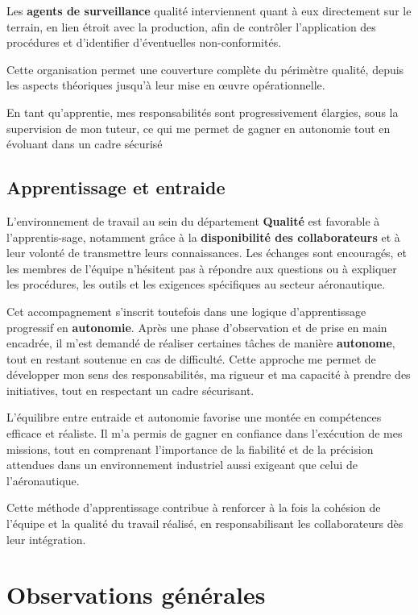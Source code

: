 \noindent Les \textbf{agents de surveillance} qualité interviennent quant à eux directement sur le terrain, en lien étroit avec la production, afin de contrôler l’application des procédures et d’identifier d’éventuelles non-conformités. 

\noindent Cette organisation permet une couverture complète du périmètre qualité, depuis les aspects théoriques jusqu’à leur mise en œuvre opérationnelle.

\noindent En tant qu’apprentie, mes responsabilités sont progressivement élargies, sous la supervision de mon tuteur, ce qui me permet de gagner en autonomie tout en évoluant dans un cadre sécurisé

\subsection*{Apprentissage et entraide}
{}
L’environnement de travail au sein du département \textbf{Qualité} est favorable à l’apprentis-sage, notamment grâce à la \textbf{disponibilité des collaborateurs} et à leur volonté de transmettre leurs connaissances. Les échanges sont encouragés, et les membres de l’équipe n’hésitent pas à répondre aux questions ou à expliquer les procédures, les outils et les exigences spécifiques au secteur aéronautique.

\noindent Cet accompagnement s’inscrit toutefois dans une logique d’apprentissage progressif en \textbf{autonomie}. Après une phase d’observation et de prise en main encadrée, il m’est demandé de réaliser certaines tâches de manière \textbf{autonome}, tout en restant soutenue en cas de difficulté. Cette approche me permet de développer mon sens des responsabilités, ma rigueur et ma capacité à prendre des initiatives, tout en respectant un cadre sécurisant.

\noindent L’équilibre entre entraide et autonomie favorise une montée en compétences efficace et réaliste. Il m’a permis de gagner en confiance dans l’exécution de mes missions, tout en comprenant l’importance de la fiabilité et de la précision attendues dans un environnement industriel aussi exigeant que celui de l’aéronautique.

\noindent Cette méthode d'apprentissage contribue à renforcer à la fois la cohésion de l'équipe et la qualité du travail réalisé, en responsabilisant les collaborateurs dès leur intégration.

\section*{Observations générales}

